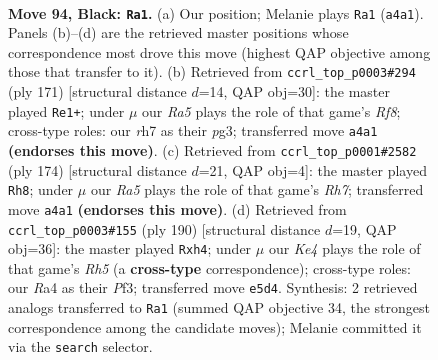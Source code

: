 \documentclass[11pt]{article}
\begin{document}
\clearpage

\begin{figure}[p]\centering
\begin{subfigure}{0.46\textwidth}\centering
\resizebox{\linewidth}{!}{%
\newchessgame
\chessboard[
  setfen={8/7R/1R2pp2/4k3/r3P3/5PK1/8/8 b - - 1 94},
  showmover=false,
  pgfstyle=straightmove, color=movearrow, markmove={a4-a1}
]}
\caption{}
\end{subfigure}\hfill
\begin{subfigure}{0.46\textwidth}\centering
\resizebox{\linewidth}{!}{%
\newchessgame
\chessboard[
  setfen={7R/5p2/4pPk1/4P2p/4K3/6P1/8/5r2 b - - 51 86},
  showmover=false,
  pgfstyle=straightmove, color=movearrow, markmove={f1-e1}
]}
\caption{}
\end{subfigure}
\\[4pt]
\begin{subfigure}{0.46\textwidth}\centering
\resizebox{\linewidth}{!}{%
\newchessgame
\chessboard[
  setfen={8/7R/6k1/8/r6p/5Kp1/6P1/8 w - - 8 88},
  showmover=false,
  pgfstyle=straightmove, color=movearrow, markmove={h7-h8}
]}
\caption{}
\end{subfigure}\hfill
\begin{subfigure}{0.46\textwidth}\centering
\resizebox{\linewidth}{!}{%
\newchessgame
\chessboard[
  setfen={8/1r6/5k2/7R/5p1p/5P1K/6P1/8 w - - 6 96},
  showmover=false,
  pgfstyle=straightmove, color=movearrow, markmove={h5-h4}
]}
\caption{}
\end{subfigure}
\caption{\textbf{Move 94, Black: \texttt{Ra1}.} (a) Our position; Melanie plays \texttt{Ra1} (\texttt{a4a1}). Panels (b)--(d) are the retrieved master positions whose correspondence most drove this move (highest QAP objective among those that transfer to it). (b) Retrieved from \texttt{ccrl\_top\_p0003\#294} (ply 171) [structural distance $d$=14, QAP obj=30]: the master played \texttt{Re1+}; under $\mu$ our \emph{Ra5} plays the role of that game's \emph{Rf8}; cross-type roles: our \emph{r}h7 as their \emph{p}g3; transferred move \texttt{a4a1} \textbf{(endorses this move)}. (c) Retrieved from \texttt{ccrl\_top\_p0001\#2582} (ply 174) [structural distance $d$=21, QAP obj=4]: the master played \texttt{Rh8}; under $\mu$ our \emph{Ra5} plays the role of that game's \emph{Rh7}; transferred move \texttt{a4a1} \textbf{(endorses this move)}. (d) Retrieved from \texttt{ccrl\_top\_p0003\#155} (ply 190) [structural distance $d$=19, QAP obj=36]: the master played \texttt{Rxh4}; under $\mu$ our \emph{Ke4} plays the role of that game's \emph{Rh5} (a \textbf{cross-type} correspondence); cross-type roles: our \emph{R}a4 as their \emph{P}f3; transferred move \texttt{e5d4}. Synthesis: 2 retrieved analogs transferred to \texttt{Ra1} (summed QAP objective 34, the strongest correspondence among the candidate moves); Melanie committed it via the \texttt{search} selector.}
\label{fig:thought-m187}
\end{figure}
\end{document}
